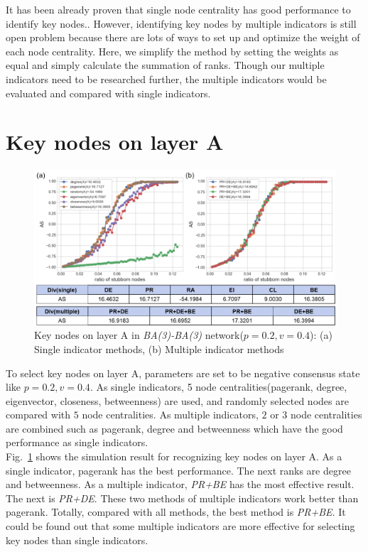 It has been already proven that single node centrality has good performance to identify key nodes.\parencite{koschutzki2008, francisco2019, bianconi2018}. However, identifying key nodes by multiple indicators is still open problem because there are lots of ways to set up and optimize the weight of each node centrality.\parencite{huang2014}  Here, we simplify the method by setting the weights as equal and simply calculate the summation of ranks. Though our multiple indicators need to be researched further, the multiple indicators would be evaluated and compared with single indicators.\\
 
\section{Key nodes on layer A}
\begin{figure}[!htb]
	\centering
	\includegraphics[width=\hsize]{figure/chap5_keynode_A.png}
	\caption{Key nodes on layer A in \textit{BA(3)-BA(3)} network($p=0.2, v=0.4$): (a) Single indicator methods, (b) Multiple indicator methods}
	\label{chap5_keynode_A}
\end{figure}
To select key nodes on layer A, parameters are set to be negative consensus state like $p=0.2, v=0.4$.  As single indicators, 5 node centralities(pagerank, degree, eigenvector, closeness, betweenness) are used, and randomly selected nodes are compared with $5$ node centralities. As multiple indicators, $2$ or $3$ node centralities are combined such as pagerank, degree and betweenness which have the good performance as single indicators. \\ 
Fig.~\ref{chap5_keynode_A} shows the simulation result for recognizing key nodes on layer A. As a single indicator, pagerank has the best performance. The next ranks are degree and betweenness. As a multiple indicator, \textit{PR+BE} has the most effective result. The next is \textit{PR+DE}. These two methods of multiple indicators work better than pagerank. Totally, compared with all methods, the best method is \textit{PR+BE}. It could be found out that some multiple indicators are more effective for selecting key nodes than single indicators. 

